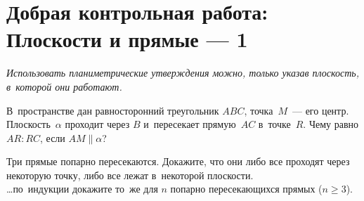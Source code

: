 
\section*{Добрая контрольная работа: Плоскости и прямые --- 1}


\emph{%
Использовать планиметрические утверждения можно, только указав плоскость,
в~которой они работают.}

\begin{problems}

\item
В~пространстве дан равносторонний треугольник $ABC$, точка~$M$~--- его центр.
Плоскость~$\alpha$ проходит через $B$ и~пересекает прямую~$AC$ в~точке~$R$.
Чему равно $AR : RC$, если $AM \parallel \alpha$?


\item
\subproblem
Три прямые попарно пересекаются.
Докажите, что они либо все проходят через некоторую точку, либо все лежат
в~некоторой плоскости.
\\
\subproblem
\ldots по~индукции докажите то~же для $n$ попарно пересекающихся прямых
($n \geq 3$).

\end{problems}

